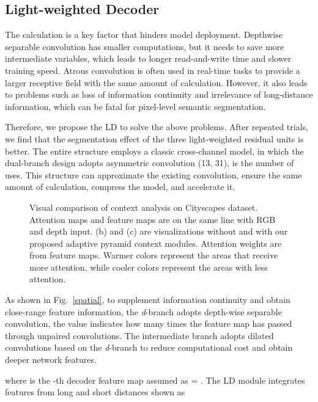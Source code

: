 \documentclass[journal,twoside,web]{ieeecolor}
\begin{document}
\subsection{Light-weighted Decoder}
The calculation is a key factor that hinders model deployment. Depthwise separable convolution has smaller computations, but it needs to save more intermediate variables, which leads to longer read-and-write time and slower training speed. Atrous convolution is often used in real-time tasks to provide a larger receptive field with the same amount of calculation. However, it also leads to problems such as loss of information continuity and irrelevance of long-distance information, which can be fatal for pixel-level semantic segmentation.

Therefore, we propose the LD to solve the above problems. After repeated trials, we find that the segmentation effect of the three light-weighted residual units is better. The entire structure employs a classic cross-channel model, in which the dual-branch design adopts asymmetric convolution  (13, 31),  is the number of uses. This structure can approximate the existing convolution, ensure the same amount of calculation, compress the model, and accelerate it. 
\begin{figure}[!t]
	\centering
	\hspace{-0.5em}
	\hspace{-0.5em}
	\caption{Visual comparison of context analysis on Cityscapes dataset. Attention maps and feature maps are on the same line with RGB and depth input. (b) and (c) are visualizations without and with our proposed adaptive pyramid context modules. Attention weights are from feature maps. Warmer colors represent the areas that receive more attention, while cooler colors represent the areas with less attention.}
	\label{context}
\end{figure}
As shown in Fig.~\ref{spatial}, to supplement information continuity and obtain close-range feature information, the \textit{d}-branch  adopts depth-wise separable convolution, the value  indicates how many times the feature map has passed through unpaired convolutions. The intermediate branch  adopts dilated convolutions based on the \textit{d}-branch to reduce computational cost and obtain deeper network features. 

where  is the -th decoder feature map assumed as  =   . The LD module integrates features from long and short distances shown as
\end{document}
